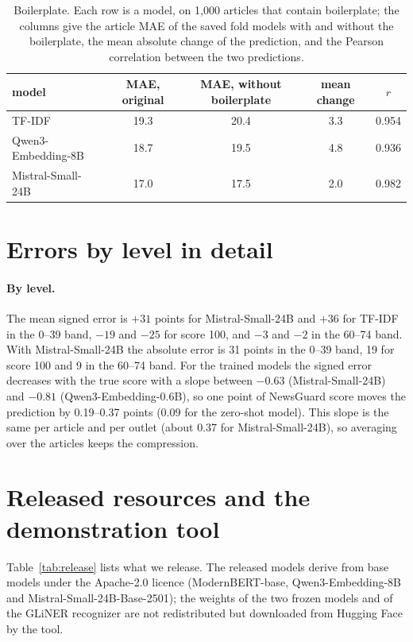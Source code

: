 \documentclass[11pt,a4paper]{article}
\begin{document}
\begin{table}[h]
\centering
\caption{Boilerplate. Each row is a model, on 1,000 articles that contain boilerplate; the columns give the article MAE
of the saved fold models with and without the boilerplate, the mean absolute change of the prediction, and the Pearson
correlation between the two predictions.}\label{tab:reading}
\begin{tabular}{lcccc}
\toprule
model & MAE, original & MAE, without boilerplate & mean change & $r$ \\
\midrule
TF-IDF & 19.3 & 20.4 & 3.3 & 0.954 \\
Qwen3-Embedding-8B & 18.7 & 19.5 & 4.8 & 0.936 \\
Mistral-Small-24B & 17.0 & 17.5 & 2.0 & 0.982 \\
\bottomrule
\end{tabular}
\end{table}

\section{Errors by level in detail}\label{app:errors}
\paragraph{By level.} The mean signed error is $+31$ points for Mistral-Small-24B and $+36$ for TF-IDF in the 0--39
band, $-19$ and $-25$ for score 100, and $-3$ and $-2$ in the 60--74 band. With Mistral-Small-24B the absolute error is
31 points in the 0--39 band, 19 for score 100 and 9 in the 60--74 band. For the trained models the signed error
decreases with the true score with a slope between $-0.63$ (Mistral-Small-24B) and $-0.81$ (Qwen3-Embedding-0.6B), so
one point of NewsGuard score moves the prediction by 0.19--0.37 points (0.09 for the zero-shot model). This slope is the
same per article and per outlet (about 0.37 for Mistral-Small-24B), so averaging over the articles keeps the
compression.

\section{Released resources and the demonstration tool}\label{app:tool}
Table~\ref{tab:release} lists what we release. The released models derive from base models under the Apache-2.0 licence
(ModernBERT-base, Qwen3-Embedding-8B and Mistral-Small-24B-Base-2501); the weights of the two frozen models and of the
GLiNER recognizer are not redistributed but downloaded from Hugging Face by the tool.
\end{document}
